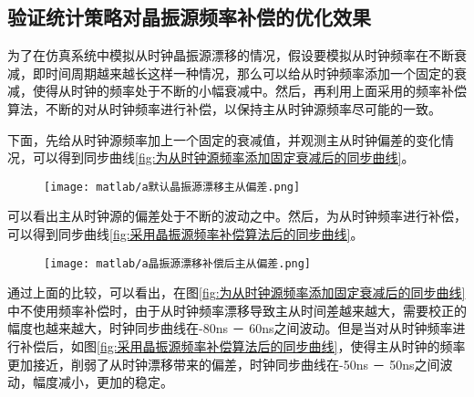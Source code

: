 \subsection{验证统计策略对晶振源频率补偿的优化效果}
为了在仿真系统中模拟从时钟晶振源漂移的情况，假设要模拟从时钟频率在不断衰减，即时间周期越来越长这样一种情况，那么可以给从时钟频率添加一个固定的衰减，使得从时钟的频率处于不断的小幅衰减中。然后，再利用上面采用的频率补偿算法，不断的对从时钟频率进行补偿，以保持主从时钟源频率尽可能的一致。

下面，先给从时钟源频率加上一个固定的衰减值，并观测主从时钟偏差的变化情况，可以得到同步曲线\ref{fig:为从时钟源频率添加固定衰减后的同步曲线}。
\begin{figure}[!hbp]
  \centering
  \begin{minipage}[b]{1\textwidth}
    \captionstyle{\centering}
    \centering
    \texttt{[image: matlab/a默认晶振源漂移主从偏差.png]}
  \end{minipage}     
\end{figure}

可以看出主从时钟源的偏差处于不断的波动之中。然后，为从时钟频率进行补偿，可以得到同步曲线\ref{fig:采用晶振源频率补偿算法后的同步曲线}。
\begin{figure}[!hbp]
  \centering
  \begin{minipage}[b]{1\textwidth}
    \captionstyle{\centering}
    \centering
    \texttt{[image: matlab/a晶振源漂移补偿后主从偏差.png]}
  \end{minipage}     
\end{figure}

通过上面的比较，可以看出，在图\ref{fig:为从时钟源频率添加固定衰减后的同步曲线}中不使用频率补偿时，由于从时钟频率漂移导致主从时间差越来越大，需要校正的幅度也越来越大，时钟同步曲线在-80ns － 60ns之间波动。但是当对从时钟频率进行补偿后，如图\ref{fig:采用晶振源频率补偿算法后的同步曲线}，使得主从时钟的频率更加接近，削弱了从时钟漂移带来的偏差，时钟同步曲线在-50ns － 50ns之间波动，幅度减小，更加的稳定。

